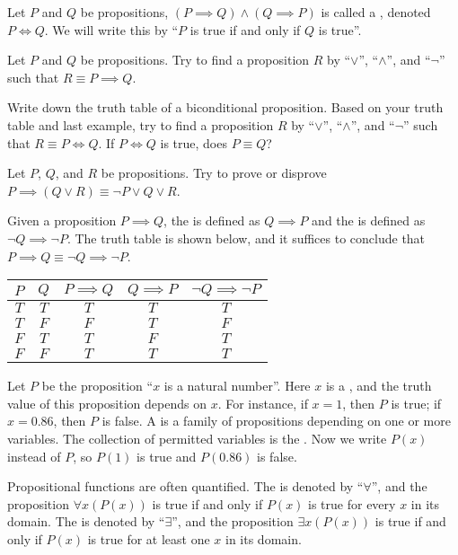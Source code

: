\documentclass[10pt]{article}
\begin{document}
\par
Let $P$ and $Q$ be propositions, $(P\implies Q)\wedge(Q\implies P)$ is called a , denoted $P\iff Q$. We will write this by ``$P$ is true if and only if $Q$ is true''.
\begin{example}
    Let $P$ and $Q$ be propositions. Try to find a proposition $R$ by ``$\vee$'', ``$\wedge$'', and ``$\neg$'' such that $R\equiv P\implies Q$.
\end{example}
\begin{example}
    Write down the truth table of a biconditional proposition. Based on your truth table and last example, try to find a proposition $R$ by ``$\vee$'', ``$\wedge$'', and ``$\neg$'' such that $R\equiv P\iff Q$. If $P\iff Q$ is true, does $P\equiv Q$?
\end{example}
\begin{example}
    Let $P$, $Q$, and $R$ be propositions. Try to prove or disprove $P\implies(Q\vee R)\equiv\neg P\vee Q\vee R$.
\end{example}
\par
Given a proposition $P\implies Q$, the  is defined as $Q\implies P$ and the  is defined as $\neg Q\implies\neg P$. The truth table is shown below, and it suffices to conclude that $P\implies Q\equiv\neg Q\implies\neg P$.
\begin{center}
    \begin{tabular}{cc|ccc}
        $P$ & $Q$ & $P\implies Q$ & $Q\implies P$ & $\neg Q\implies\neg P$ \\
        \hline
        $T$ & $T$ & $T$ & $T$ & $T$ \\
        $T$ & $F$ & $F$ & $T$ & $F$ \\
        $F$ & $T$ & $T$ & $F$ & $T$ \\
        $F$ & $F$ & $T$ & $T$ & $T$
    \end{tabular}
\end{center}
\par
Let $P$ be the proposition ``$x$ is a natural number''. Here $x$ is a , and the truth value of this proposition depends on $x$. For instance, if $x=1$, then $P$ is true; if $x=0.86$, then $P$ is false. A  is a family of propositions depending on one or more variables. The collection of permitted variables is the . Now we write $P(x)$ instead of $P$, so $P(1)$ is true and $P(0.86)$ is false.
\par
Propositional functions are often quantified. The  is denoted by ``$\forall$'', and the proposition $\forall x(P(x))$ is true if and only if $P(x)$ is true for every $x$ in its domain. The  is denoted by ``$\exists$'', and the proposition $\exists x(P(x))$ is true if and only if $P(x)$ is true for at least one $x$ in its domain.
\end{document}
